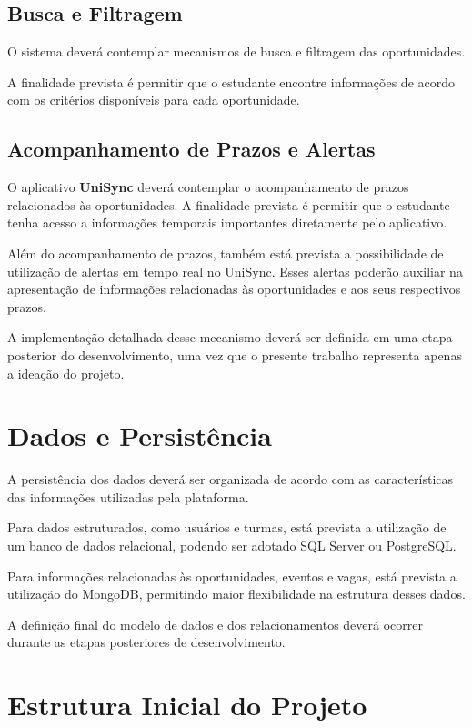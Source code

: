 \documentclass[12pt,oneside,a4paper,chapter=TITLE]{abntex2}
\begin{document}
\section{Busca e Filtragem}

O sistema deverá contemplar mecanismos de busca e filtragem das
oportunidades.

A finalidade prevista é permitir que o estudante encontre informações
de acordo com os critérios disponíveis para cada oportunidade.

\section{Acompanhamento de Prazos e Alertas}

O aplicativo \textbf{UniSync} deverá contemplar o acompanhamento de
prazos relacionados às oportunidades. A finalidade prevista é permitir
que o estudante tenha acesso a informações temporais importantes
diretamente pelo aplicativo.

Além do acompanhamento de prazos, também está prevista a possibilidade
de utilização de alertas em tempo real no UniSync. Esses alertas poderão
auxiliar na apresentação de informações relacionadas às oportunidades e
aos seus respectivos prazos.

A implementação detalhada desse mecanismo deverá ser definida em uma
etapa posterior do desenvolvimento, uma vez que o presente trabalho
representa apenas a ideação do projeto.

\chapter{Dados e Persistência}

A persistência dos dados deverá ser organizada de acordo com as
características das informações utilizadas pela plataforma.

Para dados estruturados, como usuários e turmas, está prevista a
utilização de um banco de dados relacional, podendo ser adotado SQL
Server ou PostgreSQL.

Para informações relacionadas às oportunidades, eventos e vagas, está
prevista a utilização do MongoDB, permitindo maior flexibilidade na
estrutura desses dados.

A definição final do modelo de dados e dos relacionamentos deverá
ocorrer durante as etapas posteriores de desenvolvimento.

\chapter{Estrutura Inicial do Projeto}
\end{document}
